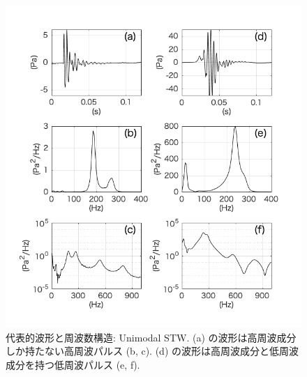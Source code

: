 \documentclass[12pt]{article}
\begin{document}
\begin{figure}[H]
\begin{center}
\includegraphics[scale=1] {Monowaveform.png} 
\caption[代表的波形と周波数構造: Unimodal STW]
{代表的波形と周波数構造: Unimodal STW. (a) の波形は高周波成分しか持たない高周波パルス (b, c). (d) の波形は高周波成分と低周波成分を持つ低周波パルス (e, f).}
\label{Monowaveform}
\end{center}
\end{figure}
\end{document}
